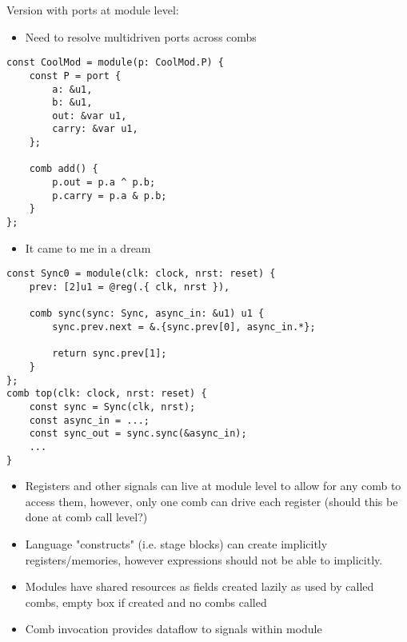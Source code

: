 \documentclass[10pt]{article}
\begin{document}
Version with ports at module level:
\begin{itemize}
	\item Need to resolve multidriven ports across combs
\end{itemize}

\begin{verbatim}
const CoolMod = module(p: CoolMod.P) {
    const P = port {
        a: &u1,
        b: &u1,
        out: &var u1,
        carry: &var u1,
    };

    comb add() {
        p.out = p.a ^ p.b; 
        p.carry = p.a & p.b;
    }
};
\end{verbatim}

\begin{itemize}
	\item It came to me in a dream
\end{itemize}

\begin{verbatim}
const Sync0 = module(clk: clock, nrst: reset) {
    prev: [2]u1 = @reg(.{ clk, nrst }),

    comb sync(sync: Sync, async_in: &u1) u1 {
        sync.prev.next = &.{sync.prev[0], async_in.*};

        return sync.prev[1];
    }
};
comb top(clk: clock, nrst: reset) {
    const sync = Sync(clk, nrst);
    const async_in = ...;
    const sync_out = sync.sync(&async_in);
    ...
}
\end{verbatim}

\begin{itemize}
	\item Registers and other signals can live at module level to allow for any comb to access them,
	      however, only one comb can drive each register (should this be done at comb call level?)
	\item Language "constructs" (i.e. stage blocks) can create implicitly registers/memories,
	      however expressions should not be able to implicitly.
\end{itemize}

\begin{itemize}
	\item Modules have shared resources as fields created lazily as used by called combs, empty box if created and no combs called
	\item Comb invocation provides dataflow to signals within module
\end{itemize}
\end{document}
